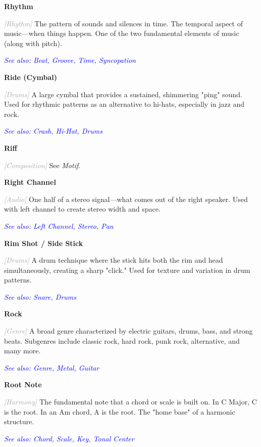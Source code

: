\documentclass[11pt,letterpaper]{article}
\newcommand{\term}[1]{\textbf{\large\color{purple}#1}}
\newcommand{\category}[1]{\textcolor{darkgray}{\textit{\small [#1]}}}
\newcommand{\seealso}[1]{\textcolor{blue}{\textit{See also: #1}}}
\newenvironment{termdef}[1]
  {\noindent\term{#1}\par\nopagebreak}
  {\par\vspace{0.3em}}
\begin{document}
\begin{termdef}{Rhythm}
\category{Rhythm}
The pattern of sounds and silences in time. The temporal aspect of music—when things happen. One of the two fundamental elements of music (along with pitch).

\seealso{Beat, Groove, Time, Syncopation}
\end{termdef}

\begin{termdef}{Ride (Cymbal)}
\category{Drums}
A large cymbal that provides a sustained, shimmering "ping" sound. Used for rhythmic patterns as an alternative to hi-hats, especially in jazz and rock.

\seealso{Crash, Hi-Hat, Drums}
\end{termdef}

\begin{termdef}{Riff}
\category{Composition}
See \textit{Motif}.
\end{termdef}

\begin{termdef}{Right Channel}
\category{Audio}
One half of a stereo signal—what comes out of the right speaker. Used with left channel to create stereo width and space.

\seealso{Left Channel, Stereo, Pan}
\end{termdef}

\begin{termdef}{Rim Shot / Side Stick}
\category{Drums}
A drum technique where the stick hits both the rim and head simultaneously, creating a sharp "click." Used for texture and variation in drum patterns.

\seealso{Snare, Drums}
\end{termdef}

\begin{termdef}{Rock}
\category{Genre}
A broad genre characterized by electric guitars, drums, bass, and strong beats. Subgenres include classic rock, hard rock, punk rock, alternative, and many more.

\seealso{Genre, Metal, Guitar}
\end{termdef}

\begin{termdef}{Root Note}
\category{Harmony}
The fundamental note that a chord or scale is built on. In C Major, C is the root. In an Am chord, A is the root. The "home base" of a harmonic structure.

\seealso{Chord, Scale, Key, Tonal Center}
\end{termdef}
\end{document}
